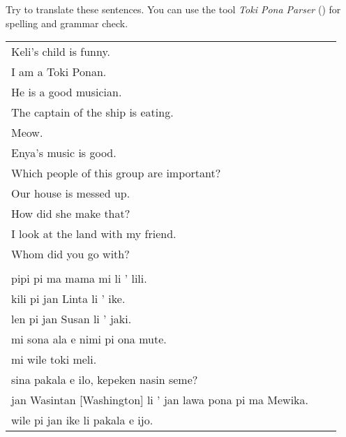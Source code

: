 Try to translate these sentences. 
You can use the tool \textit{Toki Pona Parser} (\cite{www:rowa:02}) for spelling and grammar check. 

\begin{supertabular}{p{5,5cm}|ll}
Keli's child is funny.    \\ %
I am a Toki Ponan.   \\  %
He is a good musician.   \\  %
The captain of the ship is eating.    \\ %
Meow.    \\ %
Enya's music is good.    \\ %
Which people of this group are important?    \\ %
Our house is messed up.    \\ %
How did she make that?    \\ %
I look at the land with my friend. && \\ %
Whom did you go with? &&  \\  %
 && \\ %
pipi pi ma mama mi li ' lili.  \\ %
kili pi jan Linta li ' ike.    \\ %
len pi jan Susan li ' jaki.    \\ %
mi sona ala e nimi pi ona mute.    \\ %
mi wile toki meli.    \\ %
sina pakala e ilo, kepeken nasin seme?    \\ %
jan Wasintan [Washington] li ' jan lawa pona pi ma Mewika.  \\   %
wile pi jan ike li pakala e ijo.    \\ %
\end{supertabular}  
